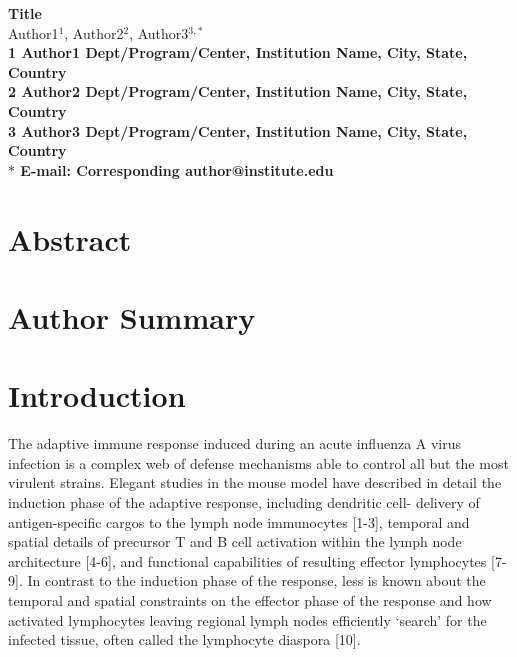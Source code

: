 \documentclass[10pt]{article}
\date{}
\begin{document}
\begin{flushleft}
{\Large
\textbf{Title}
}
\\
Author1$^{1}$, 
Author2$^{2}$, 
Author3$^{3,\ast}$
\\
\bf{1} Author1 Dept/Program/Center, Institution Name, City, State, Country
\\
\bf{2} Author2 Dept/Program/Center, Institution Name, City, State, Country
\\
\bf{3} Author3 Dept/Program/Center, Institution Name, City, State, Country
\\
$\ast$ E-mail: Corresponding author@institute.edu
\end{flushleft}



\section*{Abstract}



\section*{Author Summary}



\section*{Introduction}

The adaptive immune response induced during an acute influenza A virus infection is a complex web of defense mechanisms able to control all but the most virulent strains.  Elegant studies in the mouse model have described in detail the induction phase of the adaptive response, including dendritic cell- delivery of antigen-specific cargos to the lymph node immunocytes [1-3], temporal and spatial details of precursor T and B cell activation within the lymph node architecture [4-6], and functional capabilities of resulting effector lymphocytes [7-9].  In contrast to the induction phase of the response, less is known about the temporal and spatial constraints on the effector phase of the response and how activated lymphocytes leaving regional lymph nodes efficiently ‘search’ for the infected tissue, often called the lymphocyte diaspora [10]. 
\end{document}
